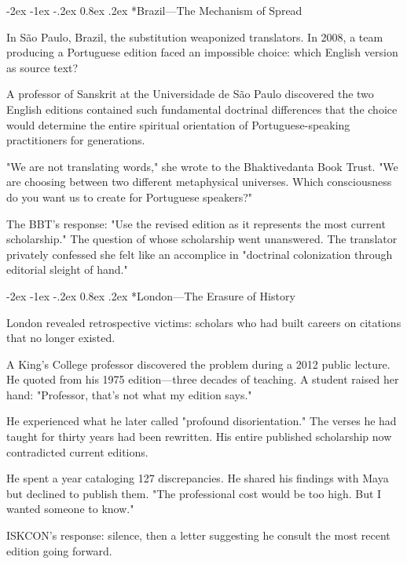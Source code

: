\documentclass[12pt,twoside]{book}
\makeatletter
\let\oldsubsection\subsection
\renewcommand{\subsection}[1]{\needspace{3\baselineskip}\oldsubsection{#1}}
\renewcommand\subsection{\@startsection{subsection}{2}{\z@}%
{-2ex \@plus -1ex \@minus -.2ex}%
{0.8ex \@plus .2ex}%
{\normalfont\large\bfseries}}
\makeatother
\begin{document}
\vspace{0.1cm}
\subsection*{Brazil—The Mechanism of Spread}

In São Paulo, Brazil, the substitution weaponized translators. In 2008, a team producing a Portuguese edition faced an impossible choice: which English version as source text?

A professor of Sanskrit at the Universidade de São Paulo discovered the two English editions contained such fundamental doctrinal differences that the choice would determine the entire spiritual orientation of Portuguese-speaking practitioners for generations.

"We are not translating words," she wrote to the Bhaktivedanta Book Trust. "We are choosing between two different metaphysical universes. Which consciousness do you want us to create for Portuguese speakers?"

The BBT's response: "Use the revised edition as it represents the most current scholarship." The question of whose scholarship went unanswered. The translator privately confessed she felt like an accomplice in "doctrinal colonization through editorial sleight of hand."

\vspace{0.1cm}
\subsection*{London—The Erasure of History}

London revealed retrospective victims: scholars who had built careers on citations that no longer existed.

A King's College professor discovered the problem during a 2012 public lecture. He quoted from his 1975 edition—three decades of teaching. A student raised her hand: "Professor, that's not what my edition says."

He experienced what he later called "profound disorientation." The verses he had taught for thirty years had been rewritten. His entire published scholarship now contradicted current editions.

He spent a year cataloging 127 discrepancies. He shared his findings with Maya but declined to publish them. "The professional cost would be too high. But I wanted someone to know."

ISKCON's response: silence, then a letter suggesting he consult the most recent edition going forward.
\end{document}

